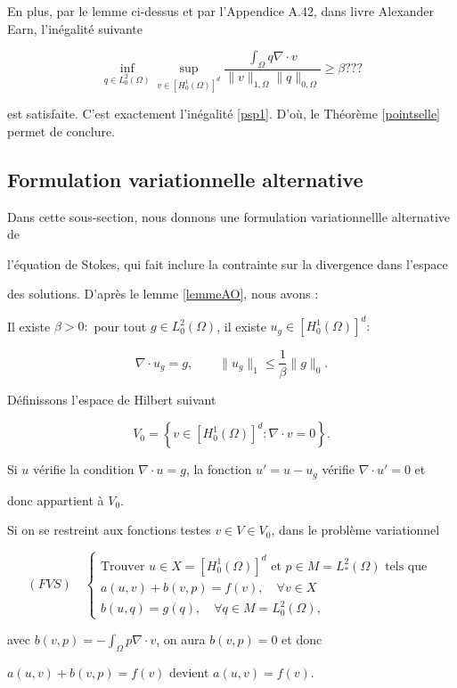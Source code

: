 En plus,  par le lemme ci-dessus et par l'Appendice A.42, dans livre Alexander Earn, l'inégalité suivante 

$$
\inf _{q \in L_{0}^{2}(\Omega)} \sup _{v \in\left[H_{0}^{1}(\Omega)\right]^{d}} \frac{\int_{\Omega} q \nabla \cdot v}{\|v\|_{1, \Omega}\|q\|_{0, \Omega}} \geq \beta ???
$$


est satisfaite. C'est exactement  l'inégalité \eqref{psp1}.  D'où, le Théorème   \ref{pointselle} permet de conclure. 
\subsection{Formulation variationnelle alternative}


Dans cette sous-section, nous donnons une  formulation variationnellle alternative  de 

l'équation de Stokes, qui fait inclure la contrainte sur la divergence  dans l'espace 

des solutions.   D'après le lemme \ref{lemmeAO},   nous avons  :

Il existe $\beta>0: $ pour tout $g\in L_{0}^{2}(\Omega)$, il existe $u_g\in  \left[H_{0}^{1}(\Omega)\right]^{d} : $ 


$$
 \nabla \cdot u_g=g, \qquad \|u_g\|_{1}\leq \frac1\beta \|g\|_0.
 $$


Définissons l'espace de Hilbert suivant

$$
V_{0}=\left\{v \in\left[H_{0}^{1}(\Omega)\right]^{d} : \nabla \cdot v=0\right\} .
$$

Si $u$ vérifie la condition $\nabla \cdot u=g$, la fonction $u'=u-u_g$ vérifie $\nabla \cdot u'=0$ et 

donc appartient à $V_0$. 

Si on se restreint aux fonctions testes $v\in V\in V_0$, dans le problème variationnel

$$
(FVS)\quad \left\{\begin{array}{l}
\text {Trouver  } u \in X=\left[H_{0}^{1}(\Omega)\right]^{d} \text { et  } p \in M =L_{*}^{2}(\Omega)\text { tels que  } \\
a(u, v)+b(v, p)=f(v), \quad \forall v \in X \\
b(u, q)=g(q), \quad \forall q \in M=L_{0}^{2}(\Omega), 
\end{array}\right.
$$

avec  $b(v, p)=-\int_{\Omega} p \nabla \cdot v$, on aura $b(v, p)=0$ et donc  

$a(u, v)+b(v, p)=f(v)$ devient  $a(u, v)=f(v)$.  

